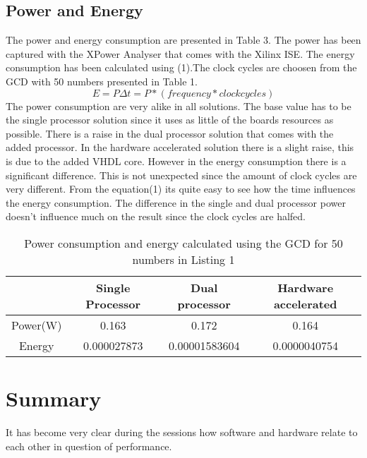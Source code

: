 \documentclass[11pt]{article}
\begin{document}
\subsection{Power and Energy}
The power and energy consumption are presented in Table 3. The power has been captured with the XPower Analyser that comes with the Xilinx ISE. The energy consumption has been calculated using (1).The clock cycles are choosen from the GCD with 50 numbers presented in Table 1. 
\begin{equation}
E = P \Delta t = P *(frequency*clock cycles)
\end{equation}
The power consumption are very alike in all solutions. The base value has to be the single processor solution since it uses as little of the boards resources as possible. There is a raise in the dual processor solution that comes with the added processor. In the hardware accelerated solution there is a slight raise, this is due to the added VHDL core.
However in the energy consumption there is a significant difference. This is not unexpected since the amount of clock cycles are very different. From the equation(1) its quite easy to see how the time influences the energy consumption. The difference in the single and dual processor power doesn't influence much on the result since the clock cycles are halfed.

\begin{table}[htbp]
   \centering
   \begin{tabular}{@{} cccc @{}} %
      \toprule
      \cmidrule(r){1-2} %
		& Single Processor	& Dual processor	& Hardware accelerated\\
      \midrule
      Power(W)	& 0.163			& 0.172			& 0.164\\

      Energy	& 0.000027873 		& 0.00001583604		& 0.0000040754\\
      \bottomrule
   \end{tabular}
   \caption{Power consumption and energy calculated using the GCD for 50 numbers in Listing 1}
   \label{tab:Clockcycles}
\end{table}

\section{Summary\label{sec:summary}}
It has become very clear during the sessions how software and hardware relate to each other in question of performance.



\end{document}

